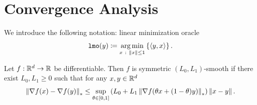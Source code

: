 \documentclass{article}
\begin{document}
{
\small


}
\newpage
\appendix
\section{Convergence Analysis}

We introduce the following notation: linear minimization oracle $$\texttt{lmo}(y) \coloneqq \operatorname*{arg\,min}_{x~:~\|x\| \le 1}\left\{\left\langle y,x\right\rangle \right\}.$$

\begin{definition}
    \label{def:gen_smooth}
    Let $f:\mathbb{R}^d\rightarrow\mathbb{R}$ be differentiable. Then $f$ is symmetric $(L_0, L_1)$-smooth if there exist $L_0,L_1 \ge 0$ such that for any $x, y \in \mathbb{R}^d$
    \begin{equation}
        \label{eq:gen_smooth}
        \left\| \nabla f(x) - \nabla f(y) \right\|_* \le \sup_{\theta \in [0,1]}\left(L_0 + L_1 \left\| \nabla f(\theta x +(1-\theta)y) \right\|_*\right)\left\| x-y \right\|.
    \end{equation}
\end{definition}
\end{document}
